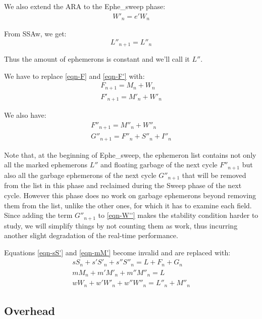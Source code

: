 \documentclass{article}
\begin{document}
We also extend the ARA to the Ephe\_sweep phase:
\begin{gather}
W'_n = e'W_n  \label{eqn-W'}
\end{gather}

From SSAw, we get:
\begin{equation}
L''_{n+1} = L''_n
\end{equation}

Thus the amount of ephemerons is constant and we'll call it $L''$.

We have to replace \eqref{eqn-F} and \eqref{eqn-F'} with:
\begin{gather}
F_{n+1} = M_n + W_n  \label{eqn-FW} \\
F'_{n+1} = M'_n + W'_n  \label{eqn-F'W}
\end{gather}

We also have:
\begin{gather}
F''_{n+1} = M''_n + W''_n  \label{eqn-F''} \\
G''_{n+1} = F''_n + S''_n + I''_n   \label{eqn-G''}
\end{gather}

Note that,
at the beginning of Ephe\_sweep, the ephemeron list contains not only
all the marked ephemerons $L''$ and floating garbage of the next
cycle $F''_{n+1}$ but also all the garbage ephemerons of the next
cycle $G''_{n+1}$ that will be removed from the list in this phase
and reclaimed
during the Sweep phase of the next cycle. However this phase does no work
on garbage ephemerons beyond removing them from the list,
unlike the other ones, for which it has to examine each field. Since
adding the term $G''_{n+1}$ to \eqref{eqn-W''} makes the stability
condition harder
to study, we will simplify things by not counting them as work, thus
incurring another slight degradation of the real-time performance.

Equations
\eqref{eqn-sS'} and \eqref{eqn-mM'} become invalid and are replaced with:
\begin{gather}
sS_n + s'S'_n + s''S''_n = L + F_n + G_n \label{eqn-sS''}  \\
mM_n + m'M'_n + m''M''_n = L  \label{eqn-mM''} \\
wW_n + w'W'_n + w''W''_n = L''_n + M''_n  \label{eqn-wW''}
\end{gather}


\subsection{Overhead}
\end{document}
